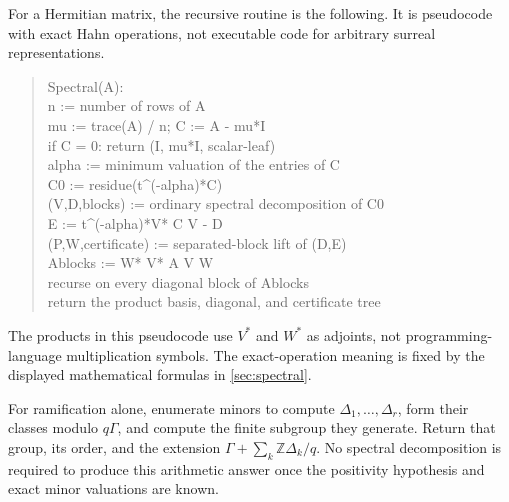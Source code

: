 \documentclass[11pt,letterpaper]{article}
\numberwithin{equation}{section}
\theoremstyle{definition}
\theoremstyle{remark}
\newcommand{\Z}{\mathbb Z}
\begin{document}
For a Hermitian matrix, the recursive routine is the following. It is
pseudocode with exact Hahn operations, not executable code for arbitrary
surreal representations.
\begin{quote}\ttfamily\small
Spectral(A):\\
\hspace*{1em}n := number of rows of A\\
\hspace*{1em}mu := trace(A) / n; C := A - mu*I\\
\hspace*{1em}if C = 0: return (I, mu*I, scalar-leaf)\\
\hspace*{1em}alpha := minimum valuation of the entries of C\\
\hspace*{1em}C0 := residue(t\string^(-alpha)*C)\\
\hspace*{1em}(V,D,blocks) := ordinary spectral decomposition of C0\\
\hspace*{1em}E := t\string^(-alpha)*V* C V - D\\
\hspace*{1em}(P,W,certificate) := separated-block lift of (D,E)\\
\hspace*{1em}Ablocks := W* V* A V W\\
\hspace*{1em}recurse on every diagonal block of Ablocks\\
\hspace*{1em}return the product basis, diagonal, and certificate tree
\end{quote}
The products in this pseudocode use $V^*$ and $W^*$ as adjoints, not
programming-language multiplication symbols. The exact-operation meaning is
fixed by the displayed mathematical formulas in \cref{sec:spectral}.

For ramification alone, enumerate minors to compute $\Delta_1,\ldots,
\Delta_r$, form their classes modulo $q\Gamma$, and compute the finite
subgroup they generate. Return that group, its order, and the extension
$\Gamma+\sum_k\Z\Delta_k/q$. No spectral decomposition is required to
produce this arithmetic answer once the positivity hypothesis and exact
minor valuations are known.
\end{document}

